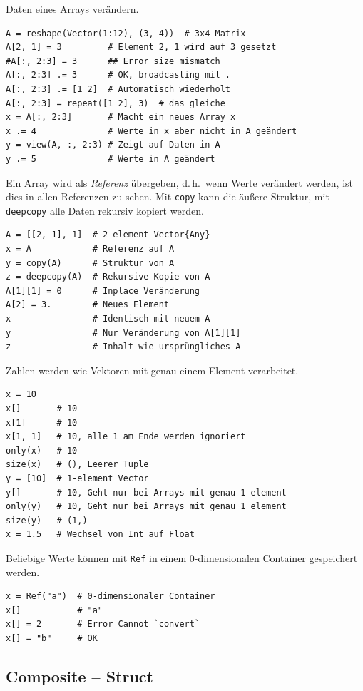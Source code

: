 \documentclass[10pt,twocolumn]{scrartcl}
\begin{document}
Daten eines Arrays verändern.

\begin{lstlisting}
A = reshape(Vector(1:12), (3, 4))  # 3x4 Matrix
A[2, 1] = 3         # Element 2, 1 wird auf 3 gesetzt
#A[:, 2:3] = 3      ## Error size mismatch
A[:, 2:3] .= 3      # OK, broadcasting mit .
A[:, 2:3] .= [1 2]  # Automatisch wiederholt
A[:, 2:3] = repeat([1 2], 3)  # das gleiche
x = A[:, 2:3]       # Macht ein neues Array x
x .= 4              # Werte in x aber nicht in A geändert
y = view(A, :, 2:3) # Zeigt auf Daten in A
y .= 5              # Werte in A geändert
\end{lstlisting}

Ein Array wird als \emph{Referenz} übergeben, d.\,h.\ wenn Werte verändert
werden, ist dies in allen Referenzen zu sehen. Mit \lstinline|copy| kann die
äußere Struktur, mit \lstinline|deepcopy| alle Daten rekursiv kopiert werden. 

\begin{lstlisting}
A = [[2, 1], 1]  # 2-element Vector{Any}
x = A            # Referenz auf A
y = copy(A)      # Struktur von A
z = deepcopy(A)  # Rekursive Kopie von A
A[1][1] = 0      # Inplace Veränderung
A[2] = 3.        # Neues Element
x                # Identisch mit neuem A
y                # Nur Veränderung von A[1][1]
z                # Inhalt wie ursprüngliches A
\end{lstlisting}

Zahlen werden wie Vektoren mit genau einem Element verarbeitet.
\begin{lstlisting}
x = 10
x[]       # 10
x[1]      # 10
x[1, 1]   # 10, alle 1 am Ende werden ignoriert
only(x)   # 10
size(x)   # (), Leerer Tuple
y = [10]  # 1-element Vector
y[]       # 10, Geht nur bei Arrays mit genau 1 element
only(y)   # 10, Geht nur bei Arrays mit genau 1 element
size(y)   # (1,)
x = 1.5   # Wechsel von Int auf Float
\end{lstlisting}

Beliebige Werte können mit \lstinline|Ref| in einem 0-dimensionalen Container gespeichert werden.

\begin{lstlisting}
x = Ref("a")  # 0-dimensionaler Container
x[]           # "a"
x[] = 2       # Error Cannot `convert`
x[] = "b"     # OK
\end{lstlisting}

\subsection{Composite -- Struct}
\label{ssec:composite}
\end{document}
